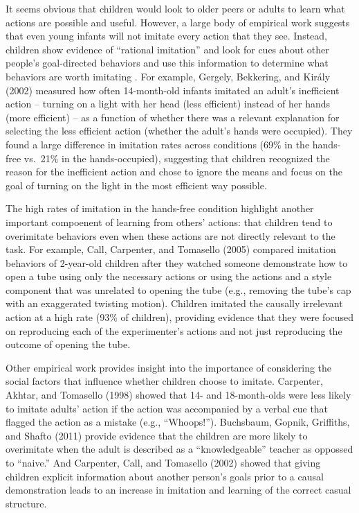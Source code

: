 \documentclass[english,man]{apa6}
\theoremstyle{definition}
\theoremstyle{definition}
\theoremstyle{definition}
\theoremstyle{remark}
\begin{document}
It seems obvious that children would look to older peers or adults to
learn what actions are possible and useful. However, a large body of
empirical work suggests that even young infants will not imitate every
action that they see. Instead, children show evidence of
\enquote{rational imitation} and look for cues about other people's
goal-directed behaviors and use this information to determine what
behaviors are worth imitating . For example, Gergely, Bekkering, and
Király (2002) measured how often 14-month-old infants imitated an
adult's inefficient action -- turning on a light with her head (less
efficient) instead of her hands (more efficient) -- as a function of
whether there was a relevant explanation for selecting the less
efficient action (whether the adult's hands were occupied). They found a
large difference in imitation rates across conditions (69\% in the
hands-free vs.~21\% in the hands-occupied), suggesting that children
recognized the reason for the inefficient action and chose to ignore the
means and focus on the goal of turning on the light in the most
efficient way possible.

The high rates of imitation in the hands-free condition highlight
another important compoenent of learning from others' actions: that
children tend to overimitate behaviors even when these actions are not
directly relevant to the task. For example, Call, Carpenter, and
Tomasello (2005) compared imitation behaviors of 2-year-old children
after they watched someone demonstrate how to open a tube using only the
necessary actions or using the actions and a style component that was
unrelated to opening the tube (e.g., removing the tube's cap with an
exaggerated twisting motion). Children imitated the causally irrelevant
action at a high rate (93\% of children), providing evidence that they
were focused on reproducing each of the experimenter's actions and not
just reproducing the outcome of opening the tube.

Other empirical work provides insight into the importance of considering
the social factors that influence whether children choose to imitate.
Carpenter, Akhtar, and Tomasello (1998) showed that 14- and
18-month-olds were less likely to imitate adults' action if the action
was accompanied by a verbal cue that flagged the action as a mistake
(e.g., \enquote{Whoops!}). Buchsbaum, Gopnik, Griffiths, and Shafto
(2011) provide evidence that the children are more likely to overimitate
when the adult is described as a \enquote{knowledgeable} teacher as
oppossed to \enquote{naive.} And Carpenter, Call, and Tomasello (2002)
showed that giving children explicit information about another person's
goals prior to a causal demonstration leads to an increase in imitation
and learning of the correct casual structure.
\end{document}
